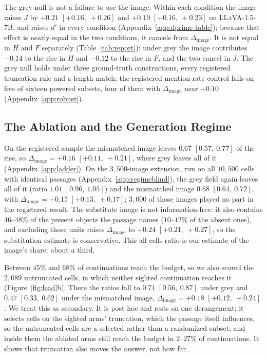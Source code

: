 \documentclass{article} %
\newcommand{\dSight}{\ensuremath{\Delta_{\mathrm{image}}}}
\newcommand{\civ}[2]{$[#1,\ #2]$}
\begin{document}
The grey null is not a failure to use the image. Within each condition the image raises $J$ by
$+0.21$ \civ{+0.16}{+0.26} and $+0.19$ \civ{+0.16}{+0.23} on \textsc{LLaVA-1.5-7B}, and raises $d'$ in
every condition (Appendix~\ref{app:dprime-table}); because that effect is nearly equal in the two
conditions, it cancels from $\dSight$. It is not equal in $H$ and $F$ separately
(Table~\ref{tab:report}): under grey the image contributes $-0.14$ to the rise in $H$ and $-0.12$ to
the rise in $F$, and the two cancel in $J$. The grey null holds under three ground-truth constructions,
every registered truncation rule and a length match; the registered mention-rate control fails on five
of sixteen powered subsets, four of them with $\dSight$ near $+0.10$ (Appendix~\ref{app:robust}).

\subsection{The Ablation and the Generation Regime}
\label{sec:twofactors}

On the registered sample the mismatched
image leaves $0.67$ \civ{0.57}{0.77} of the rise, so $\dSight = +0.16$ \civ{+0.11}{+0.21}, where grey
leaves all of it (Appendix~\ref{app:ladder}). On the $3{,}500$-image extension, run on all $10{,}500$
cells with identical passages (Appendix~\ref{app:regimeblind}), the grey field again leaves all of it
(ratio $1.01$ \civ{0.96}{1.05}) and the mismatched image $0.68$ \civ{0.64}{0.72}, with $\dSight =
+0.15$ \civ{+0.13}{+0.17}; $3{,}000$ of those images played no part in the registered result. The
substitute image is not information-free: it also contains $46$--$48\%$ of the present objects the
passage names ($10$--$12\%$ of the absent ones), and excluding those units raises $\dSight$ to $+0.24$
\civ{+0.21}{+0.27}, so the substitution estimate is conservative. This all-cells ratio is our estimate
of the image's share: about a third.

Between $45\%$ and $68\%$ of
continuations reach the budget, so we also scored the $2{,}089$ untruncated cells, in which neither
sighted continuation reaches it (Figure~\ref{fig:lead}b). There the ratios fall to $0.71$
\civ{0.56}{0.87} under grey and $0.47$ \civ{0.33}{0.62} under the mismatched image, $\dSight = +0.18$
\civ{+0.12}{+0.24}. We treat this as secondary. It is post hoc and rests on one derangement; it selects
cells on the sighted arms' truncation, which the passage itself influences, so the untruncated cells are
a selected rather than a randomized subset; and inside them the ablated arms still reach the budget in
$2$--$27\%$ of continuations. It shows that truncation also moves the answer, not how far.
\end{document}
